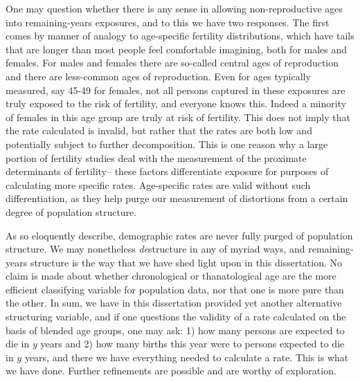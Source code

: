 One may question whether there is any sense in allowing non-reproductive ages
into remaining-years exposures, and to this we have two responses. The first
comes by manner of analogy to age-specific fertility distributions, which
have tails that are longer than most people feel comfortable imagining, 
both for males and females. For males and
females there are so-called central ages of reproduction and there are
less-common ages of reproduction. Even for ages typically measured, say
45-49 for females, not all persons captured in these exposures are truly
exposed to the risk of fertility, and everyone knows this. Indeed a minority
of females in this age group are truly at risk of fertility. This does not imply
that the rate calculated is invalid, but rather that the rates are both low and
potentially subject to further decomposition. This is one reason why a large
portion of fertility studies deal with the measurement of the proximate determinants of fertility-- these
factors differentiate exposure for purposes of calculating more specific rates.
Age-specific rates are valid without such differentiation, as they help purge
our measurement of distortions from a certain degree of population structure. 

As \citet{stolnitz1949recent} so eloquently describe, demographic rates are
never fully purged of population structure. We may nonetheless \textit{de}structure in
any of myriad ways, and remaining-years structure is the way that we have shed
light upon in this dissertation. No claim is made about whether chronological or
thanatological age are the more efficient classifying variable for population
data, nor that one is more pure than the other. In sum, we have in this
dissertation provided yet another alternative structuring variable, and if one
questions the validity of a rate calculated on the basis of blended age groups,
one may ask: 1) how many persons are expected to die in $y$ years and 2) how
many births this year were to persons expected to die in $y$ years, and there we
have everything needed to calculate a rate. This is what we have done. Further
refinements are possible and are worthy of exploration.

